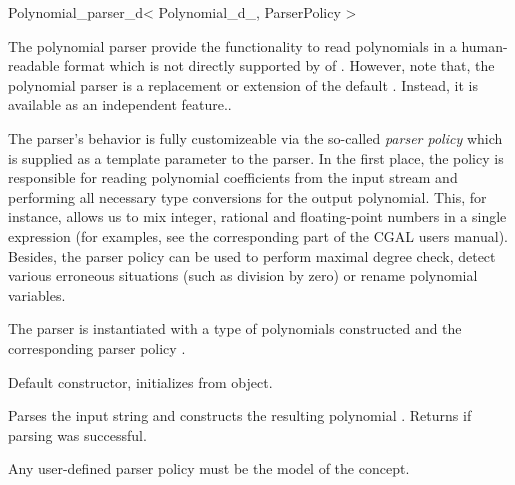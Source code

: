 % 
% 



\begin{ccRefClass}{Polynomial_parser_d< Polynomial_d_, ParserPolicy >}
\def\ccTagOperatorLayout{\ccFalse}


\ccDefinition

The polynomial parser provide the functionality to read polynomials in a human-readable format which
is not directly supported by  of . However, note that,
the polynomial parser is  a replacement or extension of the default . Instead,
it is available as an independent feature..

The parser's behavior is fully customizeable via the so-called {\em parser policy} 
which is supplied as a template parameter to the parser. 
In the first place, the policy is responsible for reading polynomial 
coefficients from the input stream and performing all necessary type conversions
for the output polynomial. This, for instance, allows us to mix integer, rational and 
floating-point numbers in a single expression (for examples, see the corresponding part of 
the CGAL users manual).
Besides, the parser policy can be used to perform maximal degree check,
detect various erroneous situations (such as division by zero) 
or rename polynomial variables.

\ccParameters
The parser is instantiated with a type 
of polynomials constructed  and the corresponding parser policy . 


\ccCreation
{}

% 

{Default constructor, initializes from  object.}

\ccOperations

{Parses the input string  and constructs the resulting polynomial . 
Returns  if parsing was successful.} 

Any user-defined parser policy must be the model of the 
concept.

\ccSeeAlso
{}

\end{ccRefClass}

